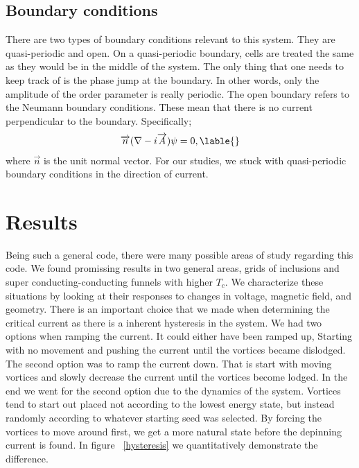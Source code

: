 \subsection{Boundary conditions}

There are two types of boundary conditions relevant to this system. They are quasi-periodic and open. On a quasi-periodic boundary, cells are treated the same as they would be in the middle of the system. The only thing that one needs to keep track of is the phase jump at the boundary. In other words, only the amplitude of the order parameter is really periodic. The open boundary refers to the Neumann boundary conditions. These mean that there is no current perpendicular to the boundary. Specifically;
\begin{eqnarray}
\overrightarrow n (\nabla - i \overrightarrow A)\psi = 0 ,
\lable{}
\end{eqnarray}
where $\overrightarrow n$ is the unit normal vector. For our studies, we stuck with quasi-periodic boundary conditions in the direction of current.



\section{Results}
Being such a general code, there were many possible areas of study regarding this code. We found promissing results in two general areas, grids of inclusions and super conducting-conducting funnels with higher $T_c$. We characterize these situations by looking at their responses to changes in voltage, magnetic field, and geometry. There is an important choice that we made when determining the critical current as there is a inherent hysteresis in the system. We had two options when ramping the current. It could either have been ramped up, Starting with no movement and pushing the current until the vortices became dislodged. The second option was to ramp the current down. That is start with moving vortices and slowly decrease the current until the vortices become lodged. In the end we went for the second option due to the dynamics of the system. Vortices tend to start out placed not according to the lowest energy state, but instead randomly according to whatever starting seed was selected. By forcing the vortices to move around first, we get a more natural state before the depinning current is found. In figure ~\ref{hysteresis} we quantitatively demonstrate the difference.

